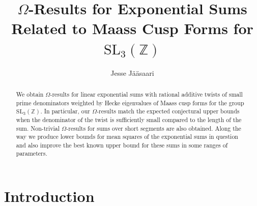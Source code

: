 \documentclass[a4paper,10pt,twoside]{amsart}
\theoremstyle{definition}
\numberwithin{equation}{section}
\renewcommand\:{\colon}
\begin{document}
\title[$\Omega$-Results for Exponential Sums Related to Maass Cusp Forms for $\mathrm{SL}_3(\mathbb Z)$]{$\Omega$-Results for Exponential Sums \\ Related to Maass Cusp Forms for $\mathrm{SL}_3(\mathbb Z)$}

\author{Jesse J\"a\"asaari}\address{Jesse J\"a\"asaari, Department of Mathematics and Statistics, University of Turku, 20014 Turku, Finland}



\begin{abstract}   
We obtain $\Omega$-results for linear exponential sums with rational additive twists of small prime denominators weighted by Hecke eigenvalues of Maass cusp forms for the group $\mathrm{SL}_3(\mathbb Z)$. In particular, our $\Omega$-results match the expected conjectural upper bounds when the denominator of the twist is sufficiently small compared to the length of the sum. Non-trivial $\Omega$-results for sums over short segments are also obtained. Along the way we produce lower bounds for mean squares of the exponential sums in question and also improve the best known upper bound for these sums in some ranges of parameters.
\end{abstract}

\maketitle
     

\section{Introduction}
\end{document}

